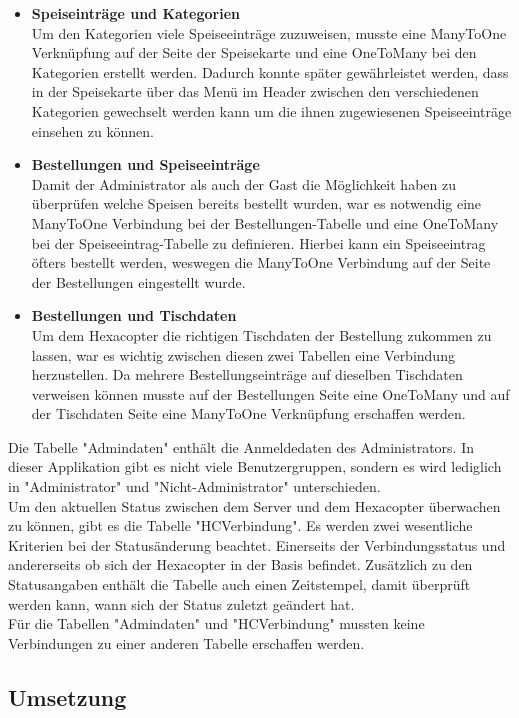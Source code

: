 \begin{itemize}
    \item \textbf{Speiseinträge und Kategorien}\\
Um den Kategorien viele Speiseeinträge zuzuweisen, musste eine ManyToOne Verknüpfung auf der Seite der Speisekarte und eine OneToMany bei den Kategorien erstellt werden. Dadurch konnte später gewährleistet werden, dass in der Speisekarte über das Menü im Header zwischen den verschiedenen Kategorien gewechselt werden kann um die ihnen zugewiesenen Speiseeinträge einsehen zu können.
    \item \textbf{Bestellungen und Speiseeinträge}\\
Damit der Administrator als auch der Gast die Möglichkeit haben zu überprüfen welche Speisen bereits bestellt wurden, war es notwendig eine ManyToOne Verbindung bei der Bestellungen-Tabelle und eine OneToMany bei der Speiseeintrag-Tabelle zu definieren. Hierbei kann ein Speiseeintrag öfters bestellt werden, weswegen die ManyToOne Verbindung auf der Seite der Bestellungen eingestellt wurde. 
\pagebreak
    \item \textbf{Bestellungen und Tischdaten}\\ 
Um dem Hexacopter die richtigen Tischdaten der Bestellung zukommen zu lassen, war es wichtig zwischen diesen zwei Tabellen eine Verbindung herzustellen. Da mehrere Bestellungseinträge auf dieselben Tischdaten verweisen können musste auf der Bestellungen Seite eine OneToMany und auf der Tischdaten Seite eine ManyToOne Verknüpfung erschaffen werden.
  \end{itemize} 
Die Tabelle "Admindaten" enthält die Anmeldedaten des Administrators. In dieser Applikation gibt es nicht viele Benutzergruppen, sondern es wird lediglich in "Administrator" und "Nicht-Administrator" unterschieden.\\
Um den aktuellen Status zwischen dem Server und dem Hexacopter überwachen zu können, gibt es die Tabelle "HCVerbindung". Es werden zwei wesentliche Kriterien bei der Statusänderung beachtet. Einerseits der Verbindungsstatus und andererseits ob sich der Hexacopter in der Basis befindet. Zusätzlich zu den Statusangaben enthält die Tabelle auch einen Zeitstempel, damit überprüft werden kann, wann sich der Status zuletzt geändert hat.\\
Für die Tabellen "Admindaten" und "HCVerbindung" mussten keine Verbindungen zu einer anderen Tabelle erschaffen werden. 

  \subsection{Umsetzung}

